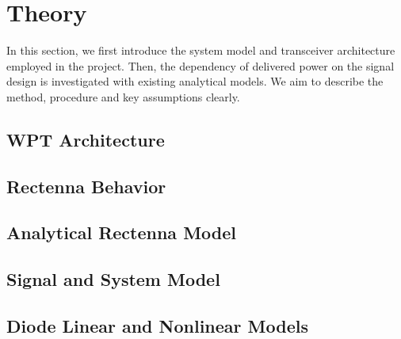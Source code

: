 \chapter{Theory}
In this section, we first introduce the system model and transceiver architecture employed in the project. Then, the dependency of delivered power on the signal design is investigated with existing analytical models. We aim to describe the method, procedure and key assumptions clearly.

\section{WPT Architecture}
  

\section{Rectenna Behavior}
  

\section{Analytical Rectenna Model}
  

\section{Signal and System Model}
  

\section{Diode Linear and Nonlinear Models}
  
